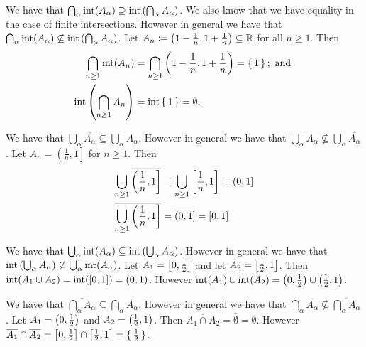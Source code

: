 \documentclass[letterpaper, 11pt]{article}
\begin{document}
\begin{ex}
  We have that $\bigcap_{\alpha} \inte(A_{\alpha}) \containseq \inte\pqty{\bigcap_{\alpha} A_{\alpha}}$.
  We also know that we have equality in the case of finite intersections.
  However in general we have that $\bigcap_{\alpha} \inte(A_{\alpha}) \not\subseteq \inte\pqty{ \bigcap_{\alpha} A_{\alpha}}$.
  Let $A_{n} \defeq \pqty{1 - \frac{1}{n}, 1 + \frac{1}{n}} \subseteq \R$ for all $n \geq 1$.
  Then
  \begin{align*}
    \Bigcap_{n \geq 1} \inte(A_{n}) &= \Bigcap_{n \geq 1} \pqty{1 - \frac{1}{n}, 1 + \frac{1}{n}} = \set{1}; \text{ and } \\
    \inte\pqty{\Bigcap_{n \geq 1} A_{n}} &= \inte \set{1} = \emptyset.
  \end{align*}
\end{ex}

\begin{ex}
  We have that $\bigcup_{\alpha} \overline{A_{\alpha}} \subseteq \overline{\bigcup_{\alpha} A_{\alpha}}$.
  However in general we have that  $\overline{\bigcup_{\alpha} A_{\alpha}} \not\subseteq \bigcup_{\alpha} \overline{A_{\alpha}}$.
  Let $A_{n} = \left( \frac{1}{n}, 1 \right]$ for $n \geq 1$.
  Then
  \begin{align*}
    \Bigcup_{n \geq 1} \overline{\left( \frac{1}{n}, 1 \right]} &= \Bigcup_{n \geq 1} \bqty{\frac{1}{n}, 1} =  (0, 1] \\
    \overline{\Bigcup_{n \geq 1} \left( \frac{1}{n}, 1 \right]} &= \overline{(0, 1]} = [0, 1]
  \end{align*}
\end{ex}

\begin{ex}
  We have that $\bigcup_{\alpha} \inte(A_{\alpha}) \subseteq \inte\pqty{\bigcup_{\alpha} A_{\alpha}}$.
  However in general we have that $\inte\pqty{\bigcup_{\alpha} A_{\alpha}} \not\subseteq \bigcup_{\alpha} \inte(A_{\alpha})$.
  Let $A_{1} = \bqty{0, \frac{1}{2}}$ and let $A_{2} = \bqty{\frac{1}{2}, 1}$.
  Then $\operatorname{int}(A_{1} \cup A_{2}) = \operatorname{int}([0, 1]) = (0, 1)$.
  However $\inte(A_{1}) \cup \inte(A_{2}) = \pqty{0, \frac{1}{2}} \cup \pqty{\frac{1}{2}, 1}$.
\end{ex}

\begin{ex}
  We have that $\overline{\bigcap_{\alpha} A_{\alpha}} \subseteq \bigcap_{\alpha} \overline{A_{\alpha}}$.
  However in general we have that $\bigcap_{\alpha} \overline{A_{\alpha}} \not\subseteq \overline{\bigcap_{\alpha} A_{\alpha}}$.
  Let $A_{1} = \pqty{0, \frac{1}{2}}$ and $A_{2} = \pqty{\frac{1}{2}, 1}$.
  Then $\overline{A_{1} \cap A_{2}} = \overline{\emptyset} = \emptyset$.
  However $\overline{A_{1}} \cap \overline{A_{2}} = \bqty{0, \frac{1}{2}} \cap \bqty{\frac{1}{2}, 1} = \set{\frac{1}{2}}$.
\end{ex}
\end{document}

